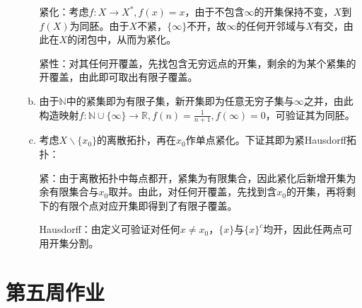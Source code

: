 \documentclass[a4paper,UTF8,fontset=windows]{ctexart}
\begin{document}
\begin{enumerate}[(1)]
\begin{enumerate}[(a)]
    紧化：考虑$f:X\to X^*,f(x)=x$，由于不包含$\infty$的开集保持不变，$X$到$f(X)$为同胚。由于$X$不紧，$\{\infty\}$不开，故$\infty$的任何开邻域与$X$有交，由此在$X$的闭包中，从而为紧化。
    
    紧性：对其任何开覆盖，先找包含无穷远点的开集，剩余的为某个紧集的开覆盖，由此即可取出有限子覆盖。
    
    \item
    由于$\mathbb{N}$中的紧集即为有限子集，新开集即为任意无穷子集与$\infty$之并，由此构造映射$f:\mathbb{N}\cup\{\infty\}\to\mathbb{R},f(n)=\frac{1}{n+1},f(\infty)=0$，可验证其为同胚。
    
    \item
    考虑$X\backslash\{x_0\}$的离散拓扑，再在$x_0$作单点紧化。下证其即为紧Hausdorff拓扑：
    
    紧：由于离散拓扑中每点都开，紧集为有限集合，因此紧化后新增开集为余有限集合与$x_0$取并。由此，对任何开覆盖，先找到含$x_0$的开集，再将剩下的有限个点对应开集即得到了有限子覆盖。
    
    Hausdorff：由定义可验证对任何$x\ne x_0$，$\{x\}$与$\{x\}^c$均开，因此任两点可用开集分割。
    \end{enumerate}
\end{enumerate}

\section{第五周作业}
\end{document}

